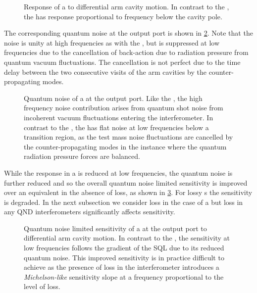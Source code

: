 \begin{figure}
  \centering
  
  \caption[Response of a \SSM{} to differential arm cavity motion]{\label{fig:ssm-response}Response of a \SSM{} to differential arm cavity motion. In contrast to the \MI{}, the \SSM{} has response proportional to frequency below the cavity pole.}
\end{figure}

The corresponding quantum noise at the output port is shown in \cref{fig:ssm-noise}. Note that the noise is unity at high frequencies as with the \FPMI{}, but is suppressed at low frequencies due to the cancellation of back-action due to radiation pressure from quantum vacuum fluctuations. The cancellation is not perfect due to the time delay between the two consecutive visits of the arm cavities by the counter-propagating modes.

\begin{figure}
  \centering
  
  \caption[Quantum noise of a \SSM{} at the output port]{\label{fig:ssm-noise}Quantum noise of a \SSM{} at the output port. Like the \MI{}, the high frequency noise contribution arises from quantum shot noise from incoherent vacuum fluctuations entering the interferometer. In contrast to the \MI{}, the \SSM{} has flat noise at low frequencies below a transition region, as the test mass noise fluctuations are cancelled by the counter-propagating modes in the instance where the quantum radiation pressure forces are balanced.}
\end{figure}

While the response in a \SSM{} is reduced at low frequencies, the quantum noise is further reduced and so the overall quantum noise limited sensitivity is improved over an equivalent \FPMI{} in the absence of loss, as shown in \cref{fig:ssm-sensitivity}. For lossy \SM{}s the sensitivity is degraded. In the next subsection we consider loss in the case of a \SSM{} but loss in any \gls{QND} interferometers significantly affects sensitivity.

\begin{figure}
  \centering
  
  \caption[Sensitivity of a \SSM{} at the output port to differential arm cavity motion]{\label{fig:ssm-sensitivity}Quantum noise limited sensitivity of a \SSM{} at the output port to differential arm cavity motion. In contrast to the \MI{}, the \SSM{} sensitivity at low frequencies follows the gradient of the \gls{SQL} due to its reduced quantum noise. This improved sensitivity is in practice difficult to achieve as the presence of loss in the interferometer introduces a \emph{Michelson-like} sensitivity slope at a frequency proportional to the level of loss.}
\end{figure}

